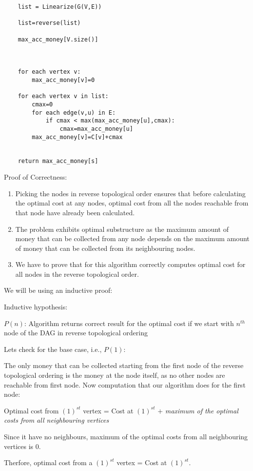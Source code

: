 \documentclass[answers]{exam}
\begin{document}
\begin{questions}
\begin{parts}
\begin{solution}
\begin{verbatim}
    list = Linearize(G(V,E))

    list=reverse(list)

    max_acc_money[V.size()]

    

    for each vertex v:
        max_acc_money[v]=0

    for each vertex v in list:
        cmax=0
        for each edge(v,u) in E:
            if cmax < max(max_acc_money[u],cmax):
                cmax=max_acc_money[u]
        max_acc_money[v]=C[v]+cmax


    return max_acc_money[s]

\end{verbatim}



Proof of Correctness:
\begin{enumerate}
    \item Picking the nodes in  reverse topological order ensures that before calculating the optimal cost at any nodes, optimal cost from all the nodes reachable from that node have already been calculated.
    \item The problem exhibits optimal substructure as the maximum amount of money that can be collected from any node depends on the maximum amount of money that can be collected from its neighbouring nodes.
    \item We have to prove that for this algorithm correctly computes optimal cost for all nodes in the reverse topological order.
\end{enumerate}
We will be using an inductive proof:

Inductive hypothesis: 

$P(n)$: Algorithm returns correct result for the optimal cost if we start with $n^{th}$ node of the DAG in reverse topological ordering

Lets check for the base case, i.e., $P(1)$:

The only money that can be collected starting from the first node of the reverse topological ordering is the money at the node itself, as no other nodes are reachable from first node.
Now computation that our algorithm does for the first node:

Optimal cost from  $(1)^{st}$ vertex = Cost at $(1)^{st}$ $+$ \textit{maximum of the optimal costs from all neighbouring vertices}

Since it have no neighbours, maximum of the optimal costs from all neighbouring vertices is $0$.

Therfore, optimal cost from a $(1)^{st}$ vertex = Cost at $(1)^{st}$.


\end{solution}
\end{parts}
\end{questions}
\end{document}
